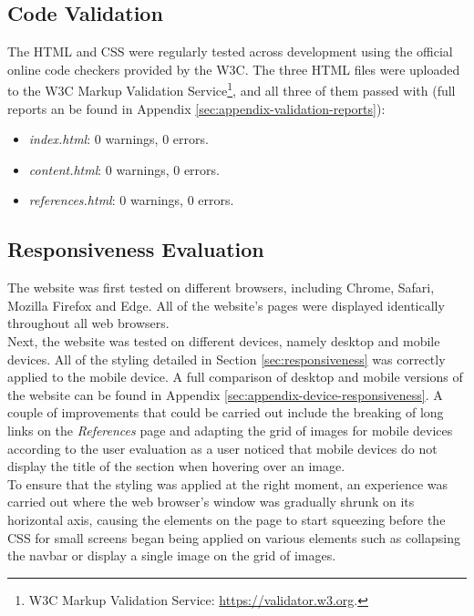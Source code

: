 \documentclass[letterpaper,12pt]{article}
\begin{document}
\subsection{Code Validation}

The HTML and CSS were regularly tested across development using the official online code checkers provided by the W3C. The three HTML files were uploaded to the W3C Markup Validation Service\footnote{W3C Markup Validation Service: \url{https://validator.w3.org}.}, and all three of them passed with (full reports an be found in Appendix \ref{sec:appendix-validation-reports}):

\begin{itemize}
    \item \textit{index.html}: 0 warnings, 0 errors.
    \item \textit{content.html}: 0 warnings, 0 errors.
    \item \textit{references.html}: 0 warnings, 0 errors.
\end{itemize}

\subsection{Responsiveness Evaluation}

The website was first tested on different browsers, including Chrome, Safari, Mozilla Firefox and Edge. All of the website's pages were displayed identically throughout all web browsers.\\

Next, the website was tested on different devices, namely desktop and mobile devices. All of the styling detailed in Section \ref{sec:responsiveness} was correctly applied to the mobile device. A full comparison of desktop and mobile versions of the website can be found in Appendix \ref{sec:appendix-device-responsiveness}. A couple of improvements that could be carried out include the breaking of long links on the \textit{References} page and adapting the grid of images for mobile devices according to the user evaluation as a user noticed that mobile devices do not display the title of the section when hovering over an image.\\

To ensure that the styling was applied at the right moment, an experience was carried out where the web browser's window was gradually shrunk on its horizontal axis, causing the elements on the page to start squeezing before the CSS for small screens began being applied on various elements such as collapsing the navbar or display a single image on the grid of images.
\end{document}
